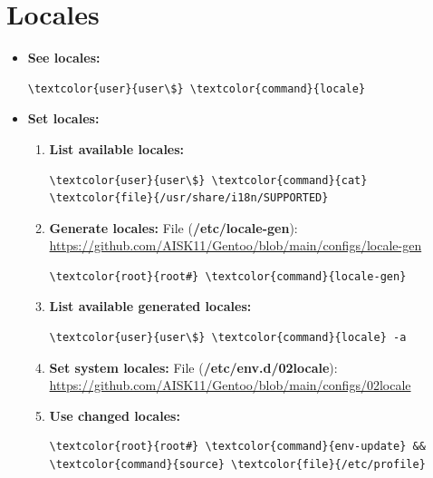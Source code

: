 \documentclass[10pt, a4paper, onecolumn, oneside, titlepage, openany]{book}
\begin{document}
\section{Locales}
\begin{itemize}
    \item \textbf{See locales:}
\begin{Verbatim}[commandchars=\\\{\}]
\textcolor{user}{user\$} \textcolor{command}{locale}
\end{Verbatim}
    \item \textbf{Set locales:}
    \begin{enumerate}
        \item \textbf{List available locales:}
\begin{Verbatim}[commandchars=\\\{\}]
\textcolor{user}{user\$} \textcolor{command}{cat} \textcolor{file}{/usr/share/i18n/SUPPORTED}
\end{Verbatim}
        \item \textbf{Generate locales:}
\newline File (\textbf{\textcolor{file}{/etc/locale-gen}}):
\newline \url{https://github.com/AISK11/Gentoo/blob/main/configs/locale-gen}
\begin{Verbatim}[commandchars=\\\{\}]
\textcolor{root}{root#} \textcolor{command}{locale-gen}
\end{Verbatim}
    \item \textbf{List available generated locales:}
\begin{Verbatim}[commandchars=\\\{\}]
\textcolor{user}{user\$} \textcolor{command}{locale} -a
\end{Verbatim}
    \item \textbf{Set system locales:}
\newline File (\textbf{\textcolor{file}{/etc/env.d/02locale}}):
\newline \url{https://github.com/AISK11/Gentoo/blob/main/configs/02locale}
    \item \textbf{Use changed locales:}
\begin{Verbatim}[commandchars=\\\{\}]
\textcolor{root}{root#} \textcolor{command}{env-update} && \textcolor{command}{source} \textcolor{file}{/etc/profile}
\end{Verbatim}
    \end{enumerate}
\end{itemize}
\end{document}
